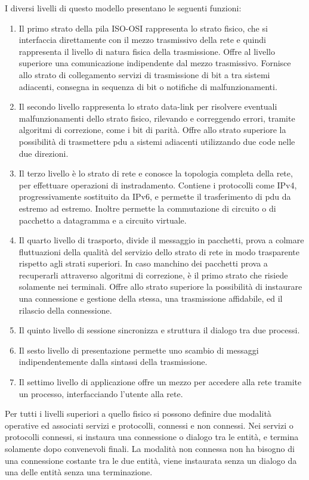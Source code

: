 \documentclass{article}
\numberwithin{equation}{subsection}
\begin{document}
I diversi livelli di questo modello presentano le seguenti funzioni:
\begin{enumerate}
  \item  Il primo strato della pila ISO-OSI rappresenta lo strato fisico, che si interfaccia direttamente con il mezzo trasmissivo della rete e quindi rappresenta il livello di 
  natura fisica della trasmissione. Offre al livello superiore una comunicazione indipendente dal mezzo trasmissivo. Fornisce allo strato di collegamento servizi di 
  trasmissione di bit a tra sistemi adiacenti, consegna in sequenza di bit o notifiche di malfunzionamenti. 
  \item Il secondo livello rappresenta lo strato data-link per risolvere eventuali malfunzionamenti dello strato fisico, rilevando e correggendo errori, tramite algoritmi di correzione, come i bit di parità. 
  Offre allo strato superiore la possibilità di trasmettere pdu a sistemi adiacenti utilizzando due code nelle due direzioni. 
  \item Il terzo livello è lo strato di rete e conosce la topologia completa della rete, per effettuare operazioni di instradamento. Contiene i protocolli come IPv4, 
  progressivamente sostituito da IPv6, e permette il trasferimento di pdu da estremo ad estremo. Inoltre permette la commutazione di circuito o di pacchetto a datagramma e 
  a circuito virtuale. 
  \item Il quarto livello di trasporto, divide il messaggio in pacchetti, prova a colmare fluttuazioni della qualità del servizio dello strato di rete in modo 
  trasparente rispetto agli strati superiori. In caso manchino dei pacchetti prova a recuperarli attraverso algoritmi di correzione, è il primo strato che risiede 
  solamente nei terminali. Offre allo strato superiore la possibilità di instaurare una connessione e gestione della stessa, una trasmissione affidabile, ed il rilascio 
  della connessione. 
  \item Il quinto livello di sessione sincronizza e struttura il dialogo tra due processi.
  \item Il sesto livello di presentazione permette uno scambio di messaggi indipendentemente dalla sintassi della trasmissione. 
  \item Il settimo livello di applicazione offre un mezzo per accedere alla rete tramite un processo, interfacciando l'utente alla rete.  
\end{enumerate}

Per tutti i livelli superiori a quello fisico si possono definire due modalità operative ed associati servizi e protocolli, connessi e non connessi. Nei servizi o 
protocolli connessi, si instaura una connessione o dialogo tra le entità, e termina solamente dopo convenevoli finali. La modalità non connessa non ha bisogno di una 
connessione costante tra le due entità, viene instaurata senza un dialogo da una delle entità senza una terminazione. 
\end{document}
